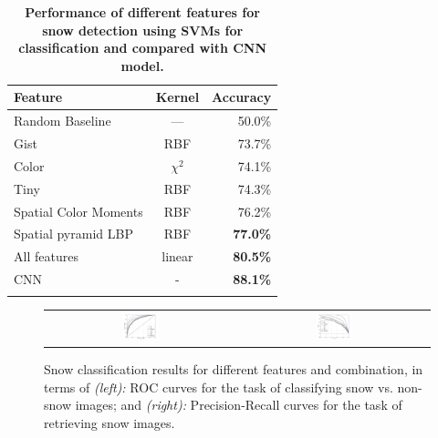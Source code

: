 \vspace{-12pt}
\begin{table}[th!]\centering
\caption{\textbf{Performance of different features for snow detection using SVMs for classification and compared with CNN model.}}
\label{tab:snow}
\tiny
\begin{tabular}{@{}lcr@{}}\toprule
Feature & Kernel & Accuracy\\\midrule
Random Baseline & --- & 50.0\%\\
Gist & RBF & 73.7\%\\
Color  & $\chi^2$ & 74.1\%\\
Tiny & RBF & 74.3\%\\
Spatial Color Moments & RBF & 76.2\%\\
Spatial pyramid LBP & RBF &\textbf{77.0\%}\\\midrule
All features  & linear & \textbf{80.5\%}\\
CNN& -& \textbf{88.1\%}\\
\bottomrule\\
\end{tabular}
\vspace{-8pt}
\end{table}


\begin{figure}[th!]
\begin{center}
\vspace{-16pt}
\begin{tabular}{cc}
 \includegraphics[width=0.2\textwidth]{figure/ROC-CNN-curves.jpg} &
\includegraphics[width=0.2\textwidth]{figure/PR-CNN-curves.jpg} \\
\end{tabular}
\end{center}
\vspace{-24pt}
\caption{
Snow classification results for different features and combination, in terms of {\textit{(left):}} ROC curves for the task of classifying snow vs. non-snow images; and 
{\textit{(right):}} Precision-Recall curves for the task of retrieving snow images.
}
\label{fig:PR_ROC_snow}
\vspace{-8pt}
\end{figure}



